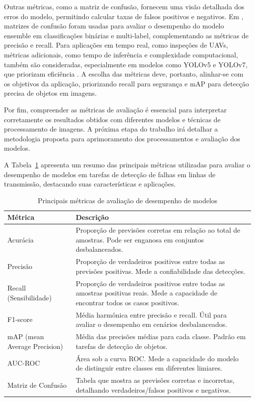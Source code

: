 Outras métricas, como a matriz de confusão, fornecem uma visão detalhada dos erros do modelo, permitindo calcular taxas de falsos positivos e negativos. Em , matrizes de confusão foram usadas para avaliar o desempenho do modelo ensemble em classificações binárias e multi-label, complementando as métricas de precisão e recall. Para aplicações em tempo real, como inspeções de UAVs, métricas adicionais, como tempo de inferência e complexidade computacional, também são consideradas, especialmente em modelos como YOLOv5 e YOLOv7, que priorizam eficiência \cite{peng2023edf}. A escolha das métricas deve, portanto, alinhar-se com os objetivos da aplicação, priorizando recall para segurança e mAP para detecção precisa de objetos em imagens.

Por fim, compreender as métricas de avaliação é essencial para interpretar corretamente os resultados obtidos com diferentes modelos e técnicas de processamento de imagens. A próxima etapa do trabalho irá detalhar a metodologia proposta para aprimoramento dos processamentos e avaliação dos modelos.

A Tabela~\ref{tab:metricas_avaliacao_modelos} apresenta um resumo das principais métricas utilizadas para avaliar o desempenho de modelos em tarefas de detecção de falhas em linhas de transmissão, destacando suas características e aplicações.

\begin{table}[H]
\centering
\caption{Principais métricas de avaliação de desempenho de modelos}
\label{tab:metricas_avaliacao_modelos}
\begin{tabular}{|p{4.5cm}|p{10cm}|}
\hline
\textbf{Métrica} & \textbf{Descrição} \\
\hline
Acurácia & Proporção de previsões corretas em relação ao total de amostras. Pode ser enganosa em conjuntos desbalanceados. \\
\hline
Precisão & Proporção de verdadeiros positivos entre todas as previsões positivas. Mede a confiabilidade das detecções. \\
\hline
Recall (Sensibilidade) & Proporção de verdadeiros positivos entre todas as amostras positivas reais. Mede a capacidade de encontrar todos os casos positivos. \\
\hline
F1-score & Média harmônica entre precisão e recall. Útil para avaliar o desempenho em cenários desbalanceados. \\
\hline
mAP (mean Average Precision) & Média das precisões médias para cada classe. Padrão em tarefas de detecção de objetos. \\
\hline
AUC-ROC & Área sob a curva ROC. Mede a capacidade do modelo de distinguir entre classes em diferentes limiares. \\
\hline
Matriz de Confusão & Tabela que mostra as previsões corretas e incorretas, detalhando verdadeiros/falsos positivos e negativos. \\
\hline
\end{tabular}
\end{table}
